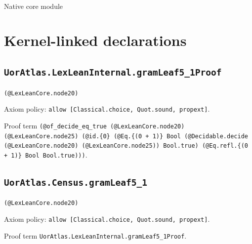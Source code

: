 \documentclass[11pt]{article}
\begin{document}
\begin{center}{\LARGE Native core module}\end{center}
\section*{Kernel-linked declarations}
\subsection*{\texttt{UorAtlas.LexLeanInternal.gramLeaf5\_1Proof}}
\noindent\texttt{(@LexLeanCore.node20)}\par
\noindent Axiom policy: \texttt{allow [Classical.choice, Quot.sound, propext]}.\par
\noindent Proof term \texttt{(@of\_decide\_eq\_true (@LexLeanCore.node20) (@LexLeanCore.node25) (@id.\{0\} (@Eq.\{(0 + 1)\} Bool (@Decidable.decide (@LexLeanCore.node20) (@LexLeanCore.node25)) Bool.true) (@Eq.refl.\{(0 + 1)\} Bool Bool.true)))}.\par
\subsection*{\texttt{UorAtlas.Census.gramLeaf5\_1}}
\noindent\texttt{(@LexLeanCore.node20)}\par
\noindent Axiom policy: \texttt{allow [Classical.choice, Quot.sound, propext]}.\par
\noindent Proof term \texttt{UorAtlas.LexLeanInternal.gramLeaf5\_1Proof}.\par
\end{document}
